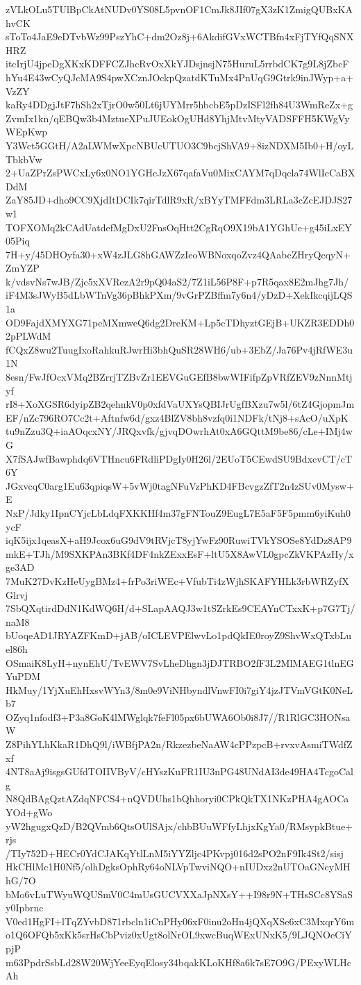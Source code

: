 zVLkOLu5TUlBpCkAtNUDv0YS08L5pvnOF1CmJk8JIf07gX3zK1ZmigQUBxKAhvCK
sToTo4JaE9eDTvbWz99PszYhC+dm2Oz8j+6AkdifGVxWCTBfn4xFjTYfQqSNXHRZ
itcIrjU4jpeDgXKxKDFFCZJhcRvOxXkYJDsjnsjN75HuruL5rrbdCK7g9L8jZbcF
hYu4E43wCyQJcMA9S4pwXCznJOckpQzatdKTuMx4PnUqG9Gtrk9inJWyp+a+VzZY
kaRy4DDgjJtF7hSh2xTjrO0w50Lt6jUYMrr5hbcbE5pDzISFl2fh84U3WmReZx+g
ZvmIx1kn/qEBQw3b4MztueXPuJUEokOgUHd8YhjMtvMtyVADSFFH5KWgVyWEpKwp
Y3Wct5GGtH/A2aLWMwXpcNBUcUTUO3C9bcjShVA9+8izNDXM5Ib0+H/oyLTbkbVw
2+UaZPrZsPWCxLy6x0NO1YGHcJzX67qafaVu0MixCAYM7qDqcla74WlIcCaBXDdM
ZaY85JD+dho9CC9XjdItDCIk7qirTdlR9xR/xBYyTMFFdm3LRLa3cZcEJDJS27w1
TOFXOMq2kCAdUatdefMgDxU2FnsOqHtt2CgRqO9X19bA1YGhUe+g45iLxEY05Piq
7H+y/45DHOyfa30+xW4zJLG8hGAWZzIeoWBNoxqoZvz4QAabcZHryQcqyN+ZmYZP
k/vdsvNs7wJB/Zjc5xXVRezA2r9pQ04aS2/7Z1iL56P8F+p7R5qax8E2mJhg7Jh/
iF4M3sJWyB5dLbWTnVg36pBhkPXm/9vGrPZBffm7y6n4/yDzD+XekIkcqijLQS1a
OD9FajdXMYXG71peMXmweQ6dg2DreKM+Lp5cTDhyztGEjB+UKZR3EDDh02pPLWdM
fCQxZ8wu2TuugIxoRahkuRJwrHi3bhQuSR28WH6/ub+3EbZ/Ja76Pv4jRfWE3u1N
8esn/FwJfOcxVMq2BZrrjTZBvZr1EEVGuGEfB8bwWIFifpZpVRfZEV9zNnnMtjyf
rI8+XoXGSR6dyipZB2qehnkV0p0xfdVaUXYsQBIJrUgfBXzu7w5l/6tZ4GjopmJm
EF/nZc796RO7Cc2t+Aftnfw6d/gxz4BlZV8bh8vzfq0i1NDFk/tNj8+sAcO/uXpK
tu9nZzu3Q+iaAOqcxNY/JRQxvfk/gjvqDOwrhAt0xA6GQttM9be86/cLe+IMj4wG
X7fSAJwfBawphdq6VTHncu6FRdliPDgIy0H26l/2EUoT5CEwdSU9BdxcvCT/cT6Y
JGxvcqC0arg1Eu63qpiqsW+5vWj0tagNFuVzPhKD4FBcvgzZfT2n4zSUv0Mysw+E
NxP/Jdky1IpnCYjcLbLdqFXKKHf4m37gFNTouZ9EugL7E5aF5F5pmm6yiKuh0ycF
iqK5ijx1qeasX+aH9Jcox6uG9dV9tRVjcT8yjYwFz90RuwiTVkYSOSe8YdDz8AP9
mkE+TJh/M9SXKPAn3BKf4DF4nkZExxEsF+ltU5X8AwVL0gpcZkVKPAzHy/xge3AD
7MuK27DvKzHeUygBMz4+frPo3riWEc+VfubTi4zWjhSKAFYHLk3rbWRZyfXGlrvj
7SbQXqtirdDdN1KdWQ6H/d+SLapAAQJ3w1tSZrkEs9CEAYnCTxxK+p7G7Tj/naM8
bUoqeAD1JRYAZFKmD+jAB/oICLEVPElwvLo1pdQkIE0royZ9ShvWxQTxbLuel86h
OSmaiK8LyH+nynEhU/TvEWV7SvLheDhgn3jDJTRBO2fF3L2MlMAEG1tlnEGYuPDM
HkMuy/1YjXuEhHxsvWYn3/8m0e9ViNHbyndlVnwFI0i7giY4jzJTVmVGtK0NeLb7
OZyq1nfodf3+P3a8GoK4lMWglqk7feFl05px6bUWA6Ob0i8J7//R1RlGC3HONsaW
Z8PihYLhKkaR1DhQ9l/iWBfjPA2n/RkzezbeNaAW4cPPzpcB+rvxvAsmiTWdfZxf
4NT8aAj9isgsGUfdTOIIVByV/cHYszKuFR1IU3nPG48UNdAI3de49HA4TcgoCalg
N8QdBAgQztAZdqNFCS4+nQVDUhs1bQhhoryi0CPkQkTX1NKzPHA4gAOCaYOd+gWo
yW2hgugxQzD/B2QVmb6QtsOUlSAjx/chbBUuWFfyLhjxKgYa0/RMsypkBtue+rjs
/TIy752D+HECr0YdCJAKqYtlLnM5iYYZljc4PKvpj016d2sPO2nF9Ik4St2/sisj
HkCHlMc1H0Nf5/olhDgksOphRy64oNLVpTwviNQO+nIUDxz2nUTOaGNcyMHhG/7O
bMo6vLuTWyuWQUSmV0C4mUsGUCVXXaJpNXsY++I98r9N+THsSCc8YSaSy0Ipbrnc
V0ed1HgFI+lTqZYvbD871rbcln1iCnPHy06xF0inu2oHn4jQXqXSe6xC3MxqrY6m
o1Q6OFQb5xKk5srHsCbPviz0xUgt8olNrOL9xwcBuqWExUNxK5/9LJQNOeCiYpjP
m63PpdrSsbLd28W20WjYeeEyqElosy34bqakKLoKHf8a6k7sE7O9G/PExyWLHcAh
